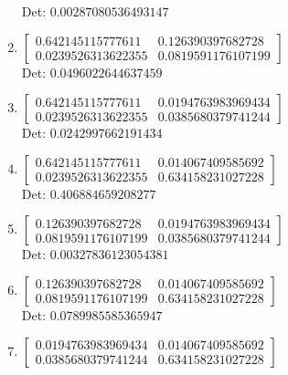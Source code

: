 \documentclass[12pt]{article}
\begin{document}
\begin{enumerate}
Det: $0.00287080536493147$\\

\item $\displaystyle \left[\begin{matrix}0.642145115777611 & 0.126390397682728\\0.0239526313622355 & 0.0819591176107199\end{matrix}\right]$\\

Det: $0.0496022644637459$\\

\item $\displaystyle \left[\begin{matrix}0.642145115777611 & 0.0194763983969434\\0.0239526313622355 & 0.0385680379741244\end{matrix}\right]$\\

Det: $0.0242997662191434$\\

\item $\displaystyle \left[\begin{matrix}0.642145115777611 & 0.014067409585692\\0.0239526313622355 & 0.634158231027228\end{matrix}\right]$\\

Det: $0.406884659208277$\\

\item $\displaystyle \left[\begin{matrix}0.126390397682728 & 0.0194763983969434\\0.0819591176107199 & 0.0385680379741244\end{matrix}\right]$\\

Det: $0.00327836123054381$\\

\item $\displaystyle \left[\begin{matrix}0.126390397682728 & 0.014067409585692\\0.0819591176107199 & 0.634158231027228\end{matrix}\right]$\\

Det: $0.0789985585365947$\\

\item $\displaystyle \left[\begin{matrix}0.0194763983969434 & 0.014067409585692\\0.0385680379741244 & 0.634158231027228\end{matrix}\right]$\\


\end{enumerate}
\end{document}
